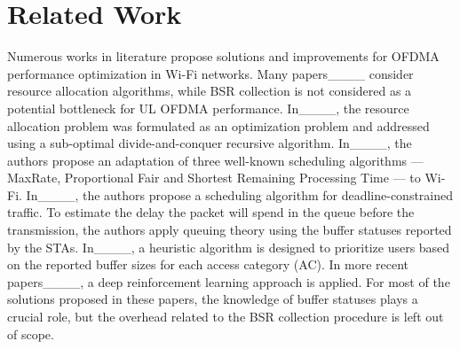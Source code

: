 \section{Related Work}
\label{related_works}

Numerous works in literature propose solutions and improvements for OFDMA
performance optimization in Wi-Fi networks. Many papers____ consider resource allocation
algorithms, while BSR collection is not considered as a potential bottleneck for
UL OFDMA performance. In____, the resource allocation problem was
formulated as an optimization problem and addressed using a sub-optimal
divide-and-conquer recursive algorithm. In____, the authors propose
an adaptation of three well-known scheduling algorithms --- MaxRate, Proportional
Fair and Shortest Remaining Processing Time --- to Wi-Fi. In____,
the authors propose a scheduling algorithm for deadline-constrained traffic. To
estimate the delay the packet will spend in the queue before the transmission,
the authors apply queuing theory using the buffer statuses reported by the
STAs. In____, a heuristic algorithm is designed to prioritize users
based on the reported buffer sizes for each access category (AC). In more recent
papers____, a deep reinforcement learning approach
is applied. For most of the solutions proposed in these papers, the knowledge
of buffer statuses plays a crucial role, but the overhead related to the BSR
collection procedure is left out of scope.

